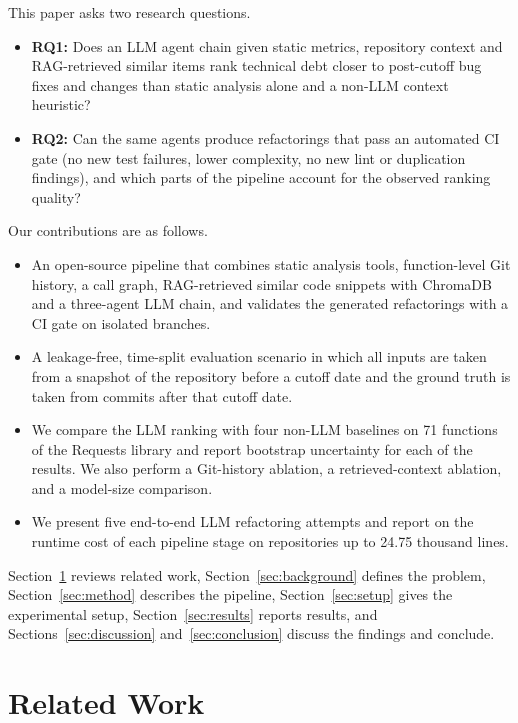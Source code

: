 \documentclass[12pt,onecolumn,draftclsnofoot]{IEEEtran}
\begin{document}
This paper asks two research questions.
\begin{itemize}
\item \textbf{RQ1:} Does an LLM agent chain given static metrics, repository context and RAG-retrieved similar items rank technical debt closer to post-cutoff bug fixes and changes than static analysis alone and a non-LLM context heuristic?
\item \textbf{RQ2:} Can the same agents produce refactorings that pass an automated CI gate (no new test failures, lower complexity, no new lint or duplication findings), and which parts of the pipeline account for the observed ranking quality?
\end{itemize}

Our contributions are as follows.
\begin{itemize}
\item An open-source pipeline that combines static analysis tools, function-level Git history, a call graph, RAG-retrieved similar code snippets with ChromaDB and a three-agent LLM chain, and validates the generated refactorings with a CI gate on isolated branches.
\item A leakage-free, time-split evaluation scenario in which all inputs are taken from a snapshot of the repository before a cutoff date and the ground truth is taken from commits after that cutoff date.
\item We compare the LLM ranking with four non-LLM baselines on 71 functions of the Requests library and report bootstrap uncertainty for each of the results. We also perform a Git-history ablation, a retrieved-context ablation, and a model-size comparison.
\item We present five end-to-end LLM refactoring attempts and report on the runtime cost of each pipeline stage on repositories up to 24.75 thousand lines.
\end{itemize}

Section~\ref{sec:related} reviews related work, Section~\ref{sec:background} defines the problem, Section~\ref{sec:method} describes the pipeline, Section~\ref{sec:setup} gives the experimental setup, Section~\ref{sec:results} reports results, and Sections~\ref{sec:discussion} and~\ref{sec:conclusion} discuss the findings and conclude.

\section{Related Work}
\label{sec:related}
\end{document}
